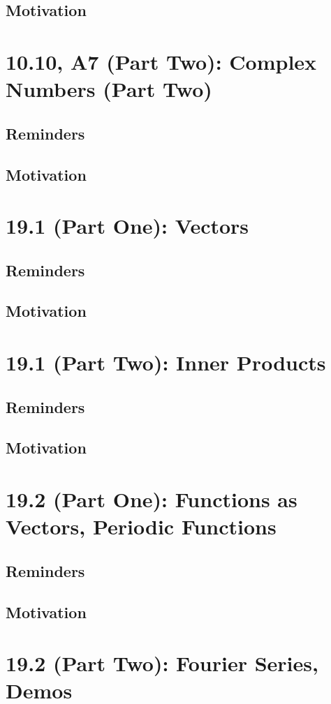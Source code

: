 \documentclass{report}
\begin{document}
\begin{sloppypar}
\section{Motivation}
\chapter{10.10, A7 (Part Two): Complex Numbers (Part Two)}
\section{Reminders}
\section{Motivation}
\chapter{19.1 (Part One): Vectors}
\section{Reminders}
\section{Motivation}
\chapter{19.1 (Part Two): Inner Products}
\section{Reminders}
\section{Motivation}

\chapter{19.2 (Part One): Functions as Vectors, Periodic
  Functions}
\section{Reminders}
\section{Motivation}
\chapter{19.2 (Part Two): Fourier Series, Demos}

\end{sloppypar}
\end{document}

